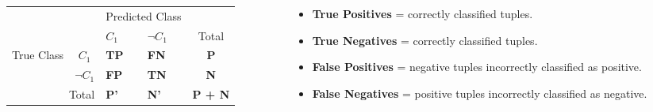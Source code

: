 \begin{columns}[T]
	\begin{column}[T]{0.45\textwidth}
		\begin{tabular}{c|c|p{1cm}|p{1cm}|c|}

			\multicolumn{2}{c|}{\multirow{2}{*}{}} & \multicolumn{2}{c|}{Predicted Class} &                                           \\\cline{3-4}
			\multicolumn{2}{c|}{}                  & $C_1$                                & $\neg C_1$  & Total                       \\\hline
			\multirow{2}{*}{True Class}            & $C_1$                                & \textbf{TP} & \textbf{FN}    & \textbf{P} \\\cline{2-4}
			                                       & $\neg C_1$                           & \textbf{FP} & \textbf{TN}    & \textbf{N} \\\hline
			\multicolumn{2}{r|}{Total}             & \textbf{P'}                          & \textbf{N'} & \textbf{P + N}
		\end{tabular}

	\end{column}

	\begin{column}[T]{0.5\textwidth}
		\footnotesize
		\begin{itemize}
			\item \textbf{True Positives} = correctly classified tuples.
			\item \textbf{True Negatives} = correctly classified tuples.
			\item \textbf{False Positives} = negative tuples incorrectly classified as positive.
			\item \textbf{False Negatives} = positive tuples incorrectly classified as negative.
		\end{itemize}
	\end{column}
\end{columns}
